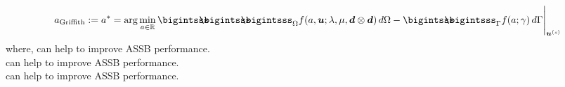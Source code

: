 \documentclass[25pt, a0paper,
portrait,
margin=2mm, 
innermargin=2mm, 
blockverticalspace=7mm, %
colspace=2mm, %
subcolspace=0mm]{tikzposter}
\makeatletter
\newcommand*{\inputfig}[3][htb]{{
    \def\fps@figure{#1}
    \def\DIR{#2}
    \def\LABEL{#3}
    \graphicspath{{\DIR/}}
    
}}
\makeatother
\begin{document}
{\begin{minipage}{0.56\textwidth}
\begin{mdframed}
			\begin{align*}
				a_{\text{Griffith}} := a^{*} = \arg\min_{a\in\mathbb{R}}{\bigintsss\!\!\!\!\!\!\bigintsss\!\!\!\!\!\!\bigintsss_{\Omega} f(a,\bm{u};\lambda,\mu,\bm{d}\otimes\bm{d}) \, d\Omega - \bigintsss\!\!\!\!\!\!\bigintsss_{\Gamma} f(a;\gamma) \, d\Gamma}\Bigg|_{\bm{u}^{(s)}}
			\end{align*}
			where,
			can help to improve ASSB performance.\\
			can help to improve ASSB performance.\\
			can help to improve ASSB performance.
		\end{mdframed}
	\end{minipage}%
	\hfill
	\begin{minipage}{0.44\textwidth}
		\begin{center}
			\inputfig{floats/routine_woTV_spectral}{routine_woTV_spectral}
		\end{center}
	\end{minipage}%
}
\end{document}
